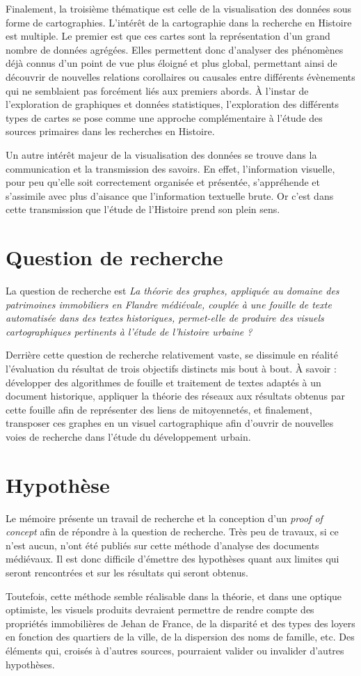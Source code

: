 Finalement, la troisième thématique est celle de la visualisation des données sous forme de cartographies. L’intérêt de la cartographie dans la recherche en Histoire est multiple. Le premier est que ces cartes sont la représentation d’un grand nombre de données agrégées. Elles permettent donc d’analyser des phénomènes déjà connus d’un point de vue plus éloigné et plus global, permettant ainsi de découvrir de nouvelles relations corollaires ou causales entre différents évènements qui ne semblaient pas forcément liés aux premiers abords. À l’instar de l’exploration de graphiques et données statistiques, l’exploration des différents types de cartes se pose comme une approche complémentaire à l’étude des sources primaires dans les recherches en Histoire.

Un autre intérêt majeur de la visualisation des données se trouve dans la communication et la transmission des savoirs. En effet, l’information visuelle, pour peu qu’elle soit correctement organisée et présentée, s’appréhende et s’assimile avec plus d’aisance que l’information textuelle brute. Or c’est dans cette transmission que l’étude de l’Histoire prend son plein sens.

\section{Question de recherche}
 La question de recherche est \emph{\og La théorie des graphes, appliquée au domaine des patrimoines immobiliers en Flandre médiévale, couplée à une fouille de texte automatisée dans des textes historiques, permet-elle de produire des visuels cartographiques pertinents à l’étude de l’histoire urbaine ?\fg{}} 
 
 Derrière cette question de recherche relativement vaste, se dissimule en réalité l'évaluation du résultat de trois objectifs distincts mis bout à bout. À savoir : développer des algorithmes de fouille et traitement de textes adaptés à un document historique, appliquer la théorie des réseaux aux résultats obtenus par cette fouille afin de représenter des liens de mitoyennetés, et finalement, transposer ces graphes en un visuel cartographique afin d'ouvrir de nouvelles voies de recherche dans l'étude du développement urbain.
 
\section{Hypothèse}
Le mémoire présente un travail de recherche et la conception d'un \textit{proof of concept} afin de répondre à la question de recherche. Très peu de travaux, si ce n'est aucun, n'ont été publiés sur cette méthode d'analyse des documents médiévaux. Il est donc difficile d'émettre des hypothèses quant aux limites qui seront rencontrées et sur les résultats qui seront obtenus.

Toutefois, cette méthode semble réalisable dans la théorie, et dans une optique optimiste,  les visuels produits devraient permettre de rendre compte des propriétés immobilières de Jehan de France, de la disparité et des types des loyers en fonction des quartiers de la ville, de la dispersion des noms de famille, etc. Des éléments qui, croisés  à d'autres sources, pourraient valider ou invalider d'autres hypothèses. 

